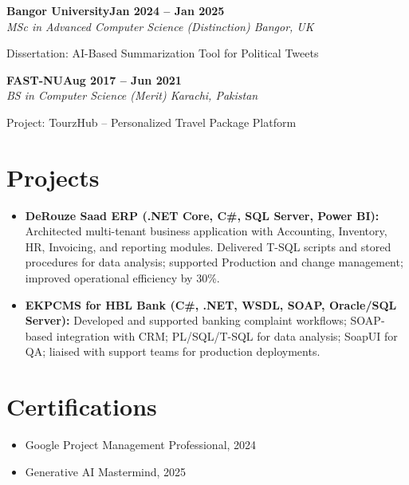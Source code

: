 \documentclass[letterpaper,10pt]{article}
\newcommand{\headingBf}[2]{
  \hspace{10pt}\textbf{#1}\hfill\textbf{#2}\\
}
\newcommand{\headingIt}[2]{
  \hspace{10pt}\textit{#1}\hfill\textit{#2}\\
}
\newenvironment{resume_list}{
  \vspace{-7pt}
  \begin{itemize}[itemsep=-2px, parsep=1pt, leftmargin=30pt]
}{
  \end{itemize}
}
\begin{document}
\headingBf{Bangor University}{Jan 2024 -- Jan 2025}
\headingIt{MSc in Advanced Computer Science (Distinction) \hfill Bangor, UK}{}
\begin{resume_list}
    \item Dissertation: AI-Based Summarization Tool for Political Tweets
\end{resume_list}

\headingBf{FAST-NU}{Aug 2017 -- Jun 2021}
\headingIt{BS in Computer Science (Merit) \hfill Karachi, Pakistan}{}
\begin{resume_list}
    \item Project: TourzHub -- Personalized Travel Package Platform
\end{resume_list}

\section{Projects}
\begin{itemize}
    \setlength\itemsep{3pt}
    \item \textbf{DeRouze Saad ERP (.NET Core, C\#, SQL Server, Power BI):} Architected multi-tenant business application with Accounting, Inventory, HR, Invoicing, and reporting modules. Delivered T-SQL scripts and stored procedures for data analysis; supported Production and change management; improved operational efficiency by 30\%.
    \item \textbf{EKPCMS for HBL Bank (C\#, .NET, WSDL, SOAP, Oracle/SQL Server):} Developed and supported banking complaint workflows; SOAP-based integration with CRM; PL/SQL/T-SQL for data analysis; SoapUI for QA; liaised with support teams for production deployments.
\end{itemize}

\section{Certifications}
\begin{itemize}
    \item Google Project Management Professional, 2024
    \item Generative AI Mastermind, 2025
\end{itemize}

\vspace*{\fill}
\end{document}
